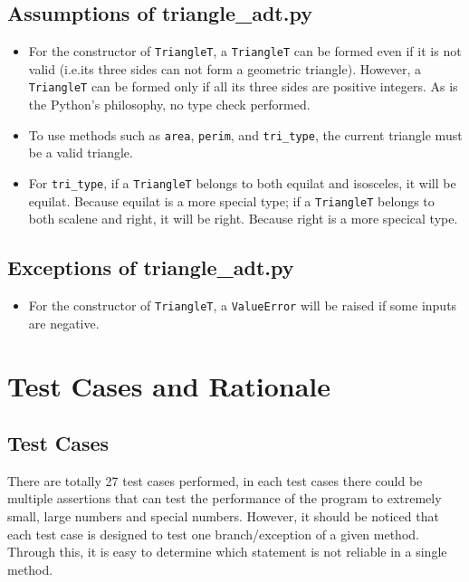 \documentclass[12pt]{article}
\begin{document}
\subsection{Assumptions of triangle\_adt.py}
\begin{itemize}
\item For the constructor of \verb|TriangleT|, a  \verb|TriangleT| can be formed even if it is not valid (i.e.its three sides can not form a geometric triangle). However, a \verb|TriangleT| can be formed only if all its three sides are positive integers. As is the Python's philosophy, no type check performed.
\item To use methods such as \verb|area|, \verb|perim|, and \verb|tri_type|,  the current triangle must be a valid triangle.
\item For \verb|tri_type|, if a \verb|TriangleT| belongs to both equilat and isosceles, it will be equilat. Because equilat is a more special type; if a \verb|TriangleT| belongs to both scalene and right, it will be right. Because right is a more specical type.
\end{itemize}
\subsection{Exceptions of triangle\_adt.py}
\begin{itemize}
\item For the constructor of \verb|TriangleT|, a \verb|ValueError| will be raised if some inputs are negative.
\end{itemize}
\section{Test Cases and Rationale} \label{Testing}
\subsection{Test Cases}
There are totally 27 test cases performed, in each test cases there could be multiple assertions that can test the performance of the program to extremely small,  large numbers and special numbers. However, it should be noticed that each test case is designed to test one branch/exception of a given method. Through this, it is easy to determine which statement is not reliable in a single method.
\end{document}
